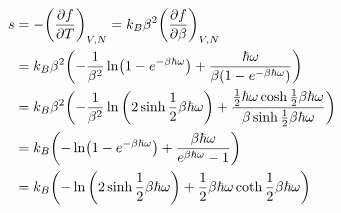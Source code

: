 \documentclass[uplatex,dvipdfmx,a4paper,11pt]{jlreq}
\theoremstyle{definition}
\begin{document}
\begin{align}
  s        & = - \qty(\pdv{f}{T})_{V,N} = k_B\beta^2\qty(\pdv{f}{\beta})_{V,N}                                                                                                                        \\
           & = k_B\beta^2\qty(-\frac{1}{\beta^2}\ln(1 - e^{-\beta\hbar\omega}) + \frac{\hbar\omega}{\beta(1 - e^{-\beta\hbar\omega})})                                                                \\
           & = k_B\beta^2\qty(-\frac{1}{\beta^2}\ln\qty(2\sinh \frac{1}{2}\beta\hbar\omega) + \frac{\frac{1}{2}\hbar\omega\cosh \frac{1}{2}\beta\hbar\omega}{\beta\sinh \frac{1}{2}\beta\hbar\omega}) \\
           & = k_B\qty(-\ln(1 - e^{-\beta\hbar\omega}) + \frac{\beta\hbar\omega}{e^{\beta\hbar\omega} - 1})                                                                                           \\
           & = k_B\qty(-\ln\qty(2\sinh\frac{1}{2}\beta\hbar\omega) + \frac{1}{2}\beta\hbar\omega\coth\frac{1}{2}\beta\hbar\omega)                                                                     \\
\end{align}
\end{document}
